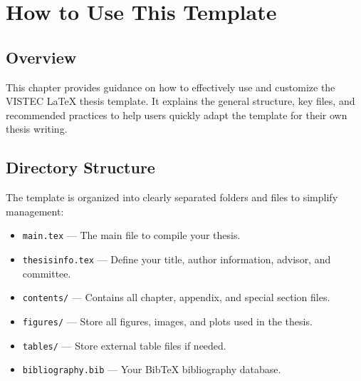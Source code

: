 


\chapter{How to Use This Template}
\label{chapter3}

\section{Overview}
\begin{paragraph}
This chapter provides guidance on how to effectively use and customize the VISTEC \LaTeX{} thesis template. It explains the general structure, key files, and recommended practices to help users quickly adapt the template for their own thesis writing.
\end{paragraph}

\section{Directory Structure}
\begin{paragraph}
The template is organized into clearly separated folders and files to simplify management:

\begin{itemize}[leftmargin=\paritemindent]
    \item \texttt{main.tex} — The main file to compile your thesis.
    \item \texttt{thesisinfo.tex} — Define your title, author information, advisor, and committee.
    \item \texttt{contents/} — Contains all chapter, appendix, and special section files.
    \item \texttt{figures/} — Store all figures, images, and plots used in the thesis.
    \item \texttt{tables/} — Store external table files if needed.
    \item \texttt{bibliography.bib} — Your BibTeX bibliography database.
\end{itemize}
\end{paragraph}


